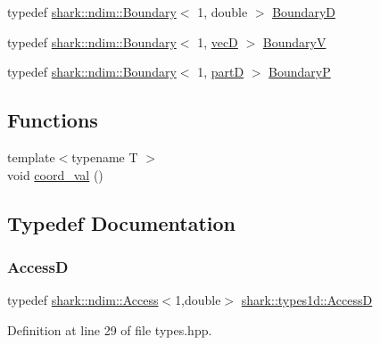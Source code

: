 \begin{DoxyCompactItemize}
\item 
typedef \hyperlink{classshark_1_1ndim_1_1_boundary}{shark\+::ndim\+::\+Boundary}$<$ 1, double $>$ \hyperlink{namespaceshark_1_1types1d_a9be30f785b4a9f1dcdac178dacf92cab}{BoundaryD}
\item 
typedef \hyperlink{classshark_1_1ndim_1_1_boundary}{shark\+::ndim\+::\+Boundary}$<$ 1, \hyperlink{namespaceshark_1_1types1d_a96b222de82755e7cdf915ca4652abb00}{vecD} $>$ \hyperlink{namespaceshark_1_1types1d_ae98e359b1d44eb9d5b96e966e7ebe29e}{BoundaryV}
\item 
typedef \hyperlink{classshark_1_1ndim_1_1_boundary}{shark\+::ndim\+::\+Boundary}$<$ 1, \hyperlink{namespaceshark_1_1types1d_a46775e0f758bf283c37ef3733ac9e294}{partD} $>$ \hyperlink{namespaceshark_1_1types1d_a9a7f7cd2f7bc5df6dbf8d9f9983248bc}{BoundaryP}
\end{DoxyCompactItemize}
\subsection*{Functions}
\begin{DoxyCompactItemize}
\item 
{\footnotesize template$<$typename T $>$ }\\void \hyperlink{namespaceshark_1_1types1d_a42d73f6e183ef96608e9fc641d3ad942}{coord\+\_\+val} ()
\end{DoxyCompactItemize}


\subsection{Typedef Documentation}
\hypertarget{namespaceshark_1_1types1d_ae9bc6d1785fb19540415dea9aad1e1bd}{}\label{namespaceshark_1_1types1d_ae9bc6d1785fb19540415dea9aad1e1bd} 
\subsubsection{\texorpdfstring{AccessD}{AccessD}}
{\footnotesize\ttfamily typedef \hyperlink{classshark_1_1ndim_1_1_access}{shark\+::ndim\+::\+Access}$<$1,double$>$ \hyperlink{namespaceshark_1_1types1d_ae9bc6d1785fb19540415dea9aad1e1bd}{shark\+::types1d\+::\+AccessD}}



Definition at line 29 of file types.\+hpp.

\hypertarget{namespaceshark_1_1types1d_ab69cddb6d83ab9c0e5abe54e7bd70425}{}\label{namespaceshark_1_1types1d_ab69cddb6d83ab9c0e5abe54e7bd70425} 
